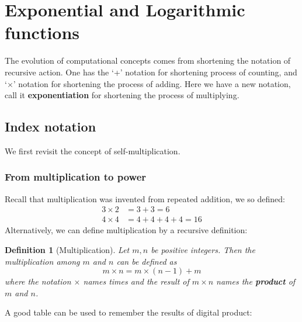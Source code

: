 \documentclass[12pt]{article}
\newtheorem{definition}{Definition}[section]
\begin{document}
    \newpage

    \section{Exponential and Logarithmic functions}

    The evolution of computational concepts comes from shortening the notation of recursive action. One has the `+' notation for shortening process of counting, and `$\times$' notation for shortening the process of adding. Here we have a new notation, call it \textbf{exponentiation} for shortening the process of multiplying.

    \subsection{Index notation}

    We first revisit the concept of self-multiplication.

    \subsubsection*{From multiplication to power}

    Recall that multiplication was invented from repeated addition, we so defined: \begin{align*}
        3\times 2&=3+3=6\\
        4\times 4&=4+4+4+4=16
    \end{align*}
    Alternatively, we can define multiplication by a recursive definition:

    \begin{definition}[Multiplication]
        Let $m,n$ be positive integers. Then the multiplication among $m$ and $n$ can be defined as $$m\times n= m\times (n-1) + m$$
        where the notation $\times$ names times and the result of $m\times n$ names the \textbf{product} of $m$ and $n$.
    \end{definition}

    A good table can be used to remember the results of digital product:
\end{document}
